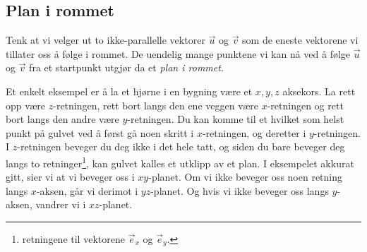 \subsection{Plan i rommet}
Tenk at vi velger ut to ikke-parallelle vektorer $ \vec{u} $ og $ \vec{v} $ som de eneste vektorene vi tillater oss å følge i rommet. De uendelig mange punktene vi kan nå ved å følge $ \vec{u} $ og $ \vec v $ fra et startpunkt utgjør da et \textit{plan i rommet}. \vsk

Et enkelt eksempel er å la et hjørne i en bygning være et $ x, y, z $ aksekors. La rett opp være $ z $-retningen, rett bort langs den ene veggen være $ x $-retningen og rett bort langs den andre være $ y $-retningen. Du kan komme til et hvilket som helst punkt på gulvet ved å først gå noen skritt i $ x $-retningen, og deretter i $ y $-retningen. I $ z $-retningen beveger du deg ikke i det hele tatt, og siden du bare beveger deg langs to  retninger\footnote{retningene til vektorene $ \vec{e}_x $ og $ \vec{e}_y $.}, kan gulvet kalles et utklipp av et plan.
I eksempelet akkurat gitt, sier vi at vi beveger oss i $ xy$-planet. Om vi ikke beveger oss noen retning langs $ x $-aksen, går vi derimot i $ yz $-planet. Og hvis vi ikke beveger oss langs $ y $-aksen, vandrer vi i $ xz $-planet.\vsk

